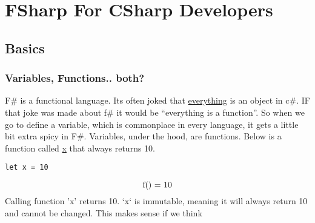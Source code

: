 \documentclass[11pt]{article}
\author{John Doe}
\date{\today}
\title{}
\begin{document}
\tableofcontents

\section{FSharp For CSharp Developers}
\label{sec:org7bcede1}

\subsection{Basics}
\label{sec:orgf1f89af}

\subsubsection{Variables, Functions.. both?}
\label{sec:org2345b2a}
F\# is a functional language. Its often joked that \uline{everything} is an object in c\#. IF that joke was made about f\# it would be ``everything is a function''. So when we go to define a variable, which is commonplace in every language, it gets a little bit extra spicy in F\#. Variables, under the hood, are functions. Below is a function called \uline{x} that always returns 10.
\begin{verbatim}
let x = 10
\end{verbatim}
\begin{equation}
$f() = 10$
\end{equation}
Calling function 'x' returns 10. `x` is immutable, meaning it will always return 10 and cannot be changed. This makes sense if we think
\end{document}
